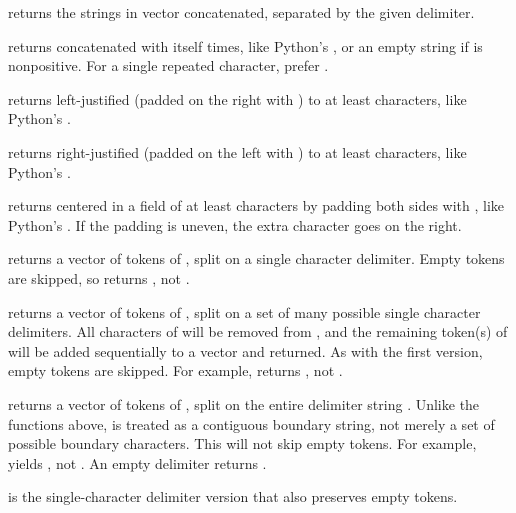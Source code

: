 \begin{compactitem}
  \item {} returns the strings in vector  concatenated, separated by the given delimiter.
  \item {} returns  concatenated with itself  times, like Python's , or an empty string if  is nonpositive. For a single repeated character, prefer .
  \item {} returns  left-justified (padded on the right with ) to at least  characters, like Python's .
  \item {} returns  right-justified (padded on the left with ) to at least  characters, like Python's .
  \item {} returns  centered in a field of at least  characters by padding both sides with , like Python's . If the padding is uneven, the extra character goes on the right.
  \item {} returns a vector of tokens of , split on a single character delimiter. Empty tokens are skipped, so  returns , not .
  \item {} returns a vector of tokens of , split on a set of many possible single character delimiters. All characters of  will be removed from , and the remaining token(s) of  will be added sequentially to a vector and returned. As with the first version, empty tokens are skipped. For example,  returns , not .
  \item {} returns a vector of tokens of , split on the entire delimiter string . Unlike the  functions above,  is treated as a contiguous boundary string, not merely a set of possible boundary characters. This will not skip empty tokens. For example,  yields , not . An empty delimiter returns .
  \item {} is the single-character delimiter version that also preserves empty tokens.
\end{compactitem}

